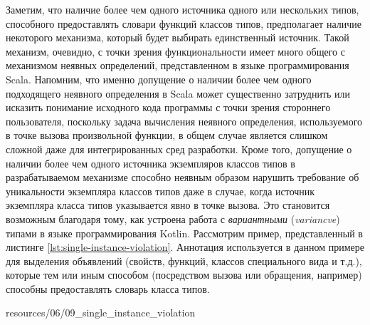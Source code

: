 Заметим, что наличие более чем одного источника одного или нескольких типов, способного предоставлять словари функций классов типов, 
предполагает наличие некоторого механизма, который будет выбирать единственный источник. Такой механизм, очевидно, с точки зрения функциональности имеет много общего с механизмом неявных определений, представленном в языке программирования Scala. Напомним, что именно допущение о наличии более чем одного подходящего неявного определения в Scala может существенно затруднить или исказить понимание исходного кода программы с точки зрения стороннего пользователя, поскольку задача вычисления неявного определения, используемого в точке вызова произвольной функции, в общем случае является слишком сложной даже для интегрированных сред разработки.    
Кроме того, допущение о наличии более чем одного источника экземпляров классов типов в разрабатываемом механизме способно неявным образом нарушить требование об уникальности экземпляра классов типов даже в случае, когда источник экземпляра класса типов указывается явно в точке вызова. Это становится возможным благодаря тому, как устроена работа с \emph{вариантными} (\emph{variancve}) типами в языке программирования Kotlin. Рассмотрим пример, представленный в листинге \ref{lst:single-instance-violation}. Аннотация  используется в данном примере для выделения объявлений (свойств, функций, классов специального вида и т.д.), которые тем или иным способом (посредством вызова или обращения, например) способны предоставлять словарь класса типов.  


{resources/06/09_single_instance_violation}

